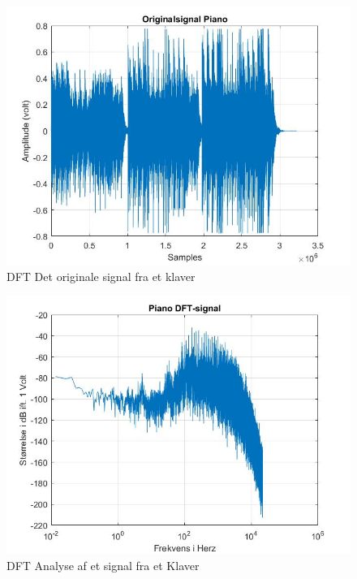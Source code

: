 \begin{figure}[ht!]
	\centering
	\includegraphics[width=180mm]{figures/Piano/original.jpg}
	\caption{DFT Det originale signal fra et klaver}
	\label{fig:Klaver original}
\end{figure}

\begin{figure}[ht!]
	\centering
	\includegraphics[width=180mm]{figures/Piano/DFT.jpg}
	\caption{DFT Analyse af et signal fra et Klaver}
	\label{fig:Klaver DFT}
\end{figure}

